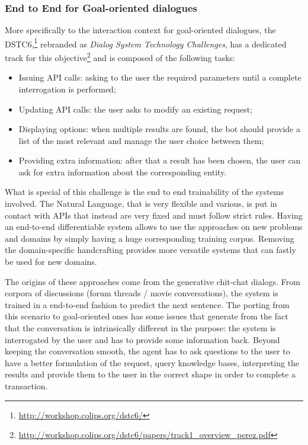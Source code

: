 \subsubsection{End to End for Goal-oriented dialogues}
More specifically to the interaction context for goal-oriented dialogues, the DSTC6,\footnote{\url{http://workshop.colips.org/dstc6/}} rebranded as \textit{Dialog System Technology Challenges}, has a dedicated track for this objective\footnote{\url{http://workshop.colips.org/dstc6/papers/track1\_overview\_perez.pdf}} and is composed of the following tasks:

\begin{itemize}
	\item Issuing API calls: asking to the user the required parameters until a complete interrogation is performed;

	\item Updating API calls: the user asks to modify an existing request;

	\item Displaying options: when multiple results are found, the bot should provide a list of the most relevant and manage the user choice between them;

	\item Providing extra information: after that a result has been chosen, the user can ask for extra information about the corresponding entity.
\end{itemize}

What is special of this challenge is the end to end trainability of the systems involved. The Natural Language, that is very flexible and various, is put in contact with APIs that instead are very fixed and must follow strict rules. Having an end-to-end differentiable system allows to use the approaches on new problems and domains by simply having a huge corresponding training corpus. Removing the domain-specific handcrafting provides more versatile systems that can fastly be used for new domains.

The origins of these approaches come from the generative chit-chat dialogs. From corpora of discussions (forum threads / movie conversations), the system is trained in a end-to-end fashion to predict the next sentence. The porting from this scenario to goal-oriented ones has some issues that generate from the fact that the conversation is intrinsically different in the purpose: the system is interrogated by the user and has to provide some information back. Beyond keeping the conversation smooth, the agent has to ask questions to the user to have a better formulation of the request, query knowledge bases, interpreting the results and provide them to the user in the correct shape in order to complete a transaction.

